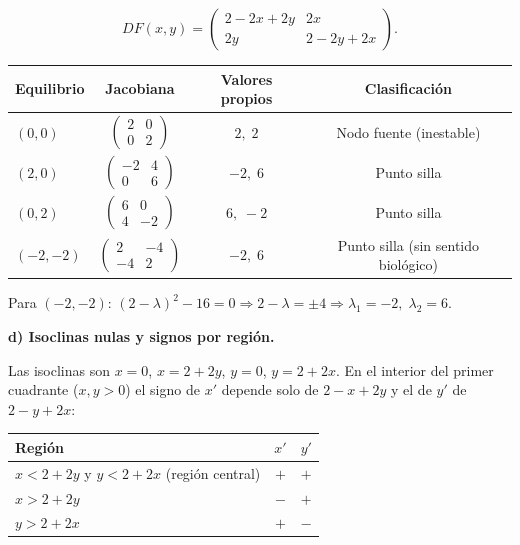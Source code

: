 \documentclass[12pt,letterpaper]{article}
\begin{document}
\[
  DF(x,y) = \begin{pmatrix} 2-2x+2y & 2x \\ 2y & 2-2y+2x \end{pmatrix}.
\]

\begin{table}[H]
\centering
\begin{tabular}{lccc}
\toprule
Equilibrio & Jacobiana & Valores propios & Clasificación \\
\midrule
$(0,0)$ & $\begin{pmatrix}2&0\\0&2\end{pmatrix}$ & $2,\;2$ & Nodo fuente (inestable) \\[8pt]
$(2,0)$ & $\begin{pmatrix}-2&4\\0&6\end{pmatrix}$ & $-2,\;6$ & Punto silla \\[8pt]
$(0,2)$ & $\begin{pmatrix}6&0\\4&-2\end{pmatrix}$ & $6,\;-2$ & Punto silla \\[8pt]
$(-2,-2)$ & $\begin{pmatrix}2&-4\\-4&2\end{pmatrix}$ & $-2,\;6$ & Punto silla (sin sentido biológico) \\
\bottomrule
\end{tabular}
\end{table}

Para $(-2,-2)$: $(2-\lambda)^2 - 16 = 0 \Rightarrow 2-\lambda = \pm4 \Rightarrow \lambda_1=-2,\;\lambda_2=6$.

\bigskip
\noindent\textbf{d) Isoclinas nulas y signos por región.}

Las isoclinas son $x=0$, $x=2+2y$, $y=0$, $y=2+2x$. En el interior del primer cuadrante ($x,y>0$) el signo de $x'$ depende solo de $2-x+2y$ y el de $y'$ de $2-y+2x$:

\begin{table}[H]
\centering
\begin{tabular}{lcc}
\toprule
Región & $x'$ & $y'$ \\
\midrule
$x < 2+2y$ y $y < 2+2x$ (región central) & $+$ & $+$ \\
$x > 2+2y$ & $-$ & $+$ \\
$y > 2+2x$ & $+$ & $-$ \\
\bottomrule
\end{tabular}
\end{table}
\end{document}
